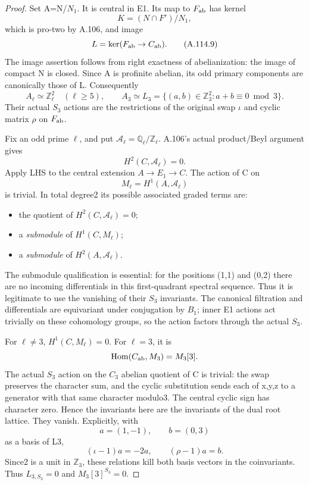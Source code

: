 \begin{proof}
Set A=N/\(N_1\). It is central in E1. Its map to \(F_{\rm ab}\) has kernel
\[
K=(N\cap F')/N_1,
\]
which is pro-two by A.106, and image
\[
L=\ker(F_{\rm ab}\to C_{\rm ab}).                              \tag{A.114.9}
\]
The image assertion follows from right exactness of abelianization: the image of compact N is closed. Since A is profinite abelian, its odd primary components are canonically those of L. Consequently
\[
A_\ell\simeq\mathbb Z_\ell^2\quad(\ell\ge5),\qquad
A_3\simeq L_3=\{(a,b)\in\mathbb Z_3^2:a+b\equiv0\bmod3\}.     \tag{A.114.10}
\]
Their actual \(S_3\) actions are the restrictions of the original swap \(\iota\) and cyclic matrix \(\rho\) on \(F_{\rm ab}\).

Fix an odd prime \(\ell\), and put \(\mathcal A_\ell=\mathbb Q_\ell/\mathbb Z_\ell\). A.106's actual product/Beyl argument gives
\[
H^2(C,\mathcal A_\ell)=0.
\]
Apply LHS to the central extension \(A\to E_1\to C\). The action of C on
\[
M_\ell=H^1(A,\mathcal A_\ell)
\]
is trivial. In total degree2 its possible associated graded terms are:
\begin{itemize}
\item the quotient of \(H^2(C,\mathcal A_\ell)=0\);
\item a \emph{submodule} of \(H^1(C,M_\ell)\);
\item a \emph{submodule} of \(H^2(A,\mathcal A_\ell)\).

\end{itemize}
The submodule qualification is essential: for the positions (1,1) and (0,2) there are no incoming differentials in this first-quadrant spectral sequence. Thus it is legitimate to use the vanishing of their \(S_3\) invariants. The canonical filtration and differentials are equivariant under conjugation by \(B_1\); inner E1 actions act trivially on these cohomology groups, so the action factors through the actual \(S_3\).

For \(\ell\ne3\), \(H^1(C,M_\ell)=0\). For \(\ell=3\), it is
\[
\operatorname{Hom}(C_{\rm ab},M_3)=M_3[3].
\]
The actual \(S_3\) action on the \(C_3\) abelian quotient of C is trivial: the swap preserves the character sum, and the cyclic substitution sends each of x,y,z to a generator with that same character modulo3. The central cyclic sign has character zero. Hence the invariants here are the invariants of the dual root lattice. They vanish. Explicitly, with
\[
a=(1,-1),\qquad b=(0,3)
\]
as a basis of L3,
\[
(\iota-1)a=-2a,\qquad(\rho-1)a=b.
\]
Since2 is a unit in \(\mathbb Z_3\), these relations kill both basis vectors in the coinvariants. Thus \(L_{3,S_3}=0\) and \(M_3[3]^{S_3}=0\).


\end{proof}
